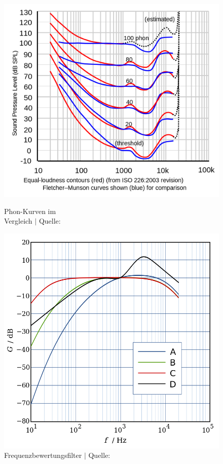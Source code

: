 \documentclass[12pt]{article}
\begin{document}
	\begin{figure}[H]
		\centering
		\begin{minipage}{.5\textwidth}
			\centering
			\includegraphics[width=1\linewidth]{images/phon-curve}
			\caption{Phon-Kurven im \\ Vergleich $\vert$ Quelle: \cite{impairments_basics_2004}}
			\label{fig:phon-curve}
		\end{minipage}%
		\begin{minipage}{.5\textwidth}
			\centering
			\includegraphics[width=0.9\linewidth]{images/Frequenzbewertung}
			\caption{Frequenzbewertungs\-filter $\vert$ Quelle: \cite{noauthor_frequenzbewertung_2023}}
			\label{fig:frequenzbewertung}
		\end{minipage}
	\end{figure}
	
\end{document}
